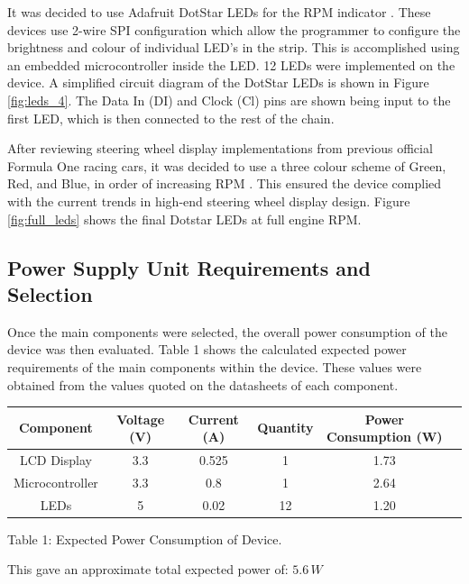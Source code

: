\documentclass[a4paper,12pt]{article}
\begin{document}
It was decided to use Adafruit DotStar LEDs for the RPM indicator \cite{dotstar_datasheet}. These devices use 2-wire SPI configuration which allow the programmer to configure the brightness and colour of individual LED’s in the strip. This is accomplished using an embedded microcontroller inside the LED. 12 LEDs were implemented on the device. A simplified circuit diagram of the DotStar LEDs is shown in Figure \ref{fig:leds_4}. The Data In (DI) and Clock (Cl) pins are shown being input to the first LED, which is then connected to the rest of the chain.



After reviewing steering wheel display implementations from previous official Formula One racing cars, it was decided to use a three colour scheme of Green, Red, and Blue, in order of increasing RPM \cite{bsim_racing, daily_mail_1}. This ensured the device complied with the current trends in high-end steering wheel display design. Figure \ref{fig:full_leds} shows the final Dotstar LEDs at full engine RPM.



\subsection{Power Supply Unit Requirements and Selection}
\label{sec:PSU}

Once the main components were selected, the overall power consumption of the device was then evaluated. Table 1 shows the calculated expected power requirements of the main components within the device. These values were obtained from the values quoted on the datasheets of each component.

\begin{center}
\begin{tabular}{ | c | c | c | c | c | c | }
\hline
 Component & Voltage (V) & Current (A) & Quantity & Power Consumption (W) \\
\hline
 LCD Display & 3.3 & 0.525 & 1 & 1.73 \\
\hline
 Microcontroller & 3.3 & 0.8 & 1 & 2.64 \\
\hline
 LEDs & 5 & 0.02 & 12 & 1.20 \\
\hline
\end{tabular}
\par
\bigskip
Table 1: Expected Power Consumption of Device.
\end{center}

This gave an approximate total expected power of: $5.6\, W$ \\
\end{document}
